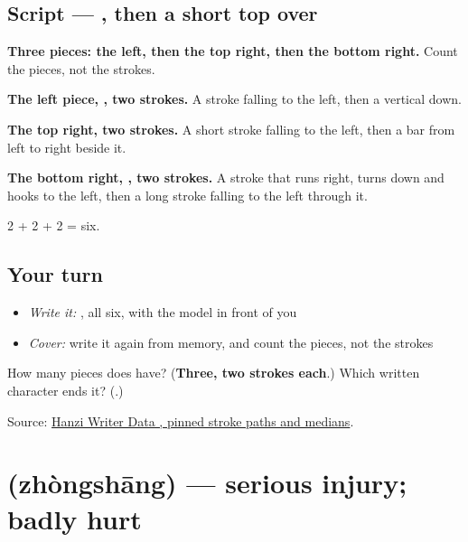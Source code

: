 \subsection*{Script — , then a short top over }

\begin{quote}
\end{quote}

\textbf{Three pieces: the left, then the top right, then the bottom right.} Count the pieces, not the strokes.

\textbf{The left piece, , two strokes.} A stroke falling to the left, then a vertical down.

\textbf{The top right, two strokes.} A short stroke falling to the left, then a bar from left to right beside it.

\textbf{The bottom right, , two strokes.} A stroke that runs right, turns down and hooks to the left, then a long stroke falling to the left through it.

2 + 2 + 2 = six.

\subsection*{Your turn}
\begin{itemize}
\raggedright
  \item \emph{Write it:} , all six, with the model in front of you
  \item \emph{Cover:} write it again from memory, and count the pieces, not the strokes
\end{itemize}

\begin{tcolorbox}[breakable,colback=teal!4,colframe=teal!35!black,title={Before you move on}]
How many pieces does  have? (\textbf{Three, two strokes each}.) Which written character ends it? (\textbf{}.)

Source: \href{https://raw.githubusercontent.com/chanind/hanzi-writer-data/68d10a4b21150cae5e1ebbd223eed289cf32d90c/data/\%E4\%BC\%A4.json}{Hanzi Writer Data , pinned stroke paths and medians}.
\end{tcolorbox}
\section[\texorpdfstring{\zh{重伤} (zhòngshāng)}{重伤 (zhòngshāng)}]{ (zhòngshāng) — serious injury; badly hurt}

